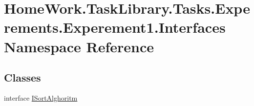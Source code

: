 \hypertarget{namespace_home_work_1_1_task_library_1_1_tasks_1_1_experements_1_1_experement1_1_1_interfaces}{}\section{Home\+Work.\+Task\+Library.\+Tasks.\+Experements.\+Experement1.\+Interfaces Namespace Reference}
\label{namespace_home_work_1_1_task_library_1_1_tasks_1_1_experements_1_1_experement1_1_1_interfaces}
\subsection*{Classes}
\begin{DoxyCompactItemize}
\item 
interface \mbox{\hyperlink{interface_home_work_1_1_task_library_1_1_tasks_1_1_experements_1_1_experement1_1_1_interfaces_1_1_i_sort_alghoritm}{I\+Sort\+Alghoritm}}
\end{DoxyCompactItemize}
